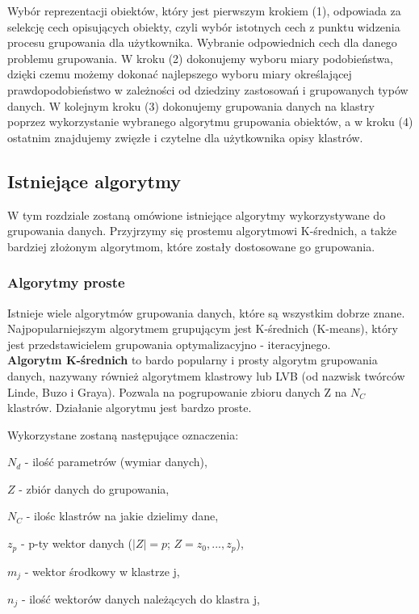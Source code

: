 \documentclass[twoside]{pracaMagisterskaMS}
\begin{document}
Wybór reprezentacji obiektów, który jest pierwszym krokiem (1), odpowiada za selekcję cech opisujących obiekty, czyli wybór istotnych cech z punktu widzenia procesu grupowania dla użytkownika. Wybranie odpowiednich cech dla danego problemu grupowania. W kroku (2) dokonujemy wyboru miary podobieństwa, dzięki czemu możemy dokonać najlepszego wyboru miary określającej prawdopodobieństwo w zależności od dziedziny zastosowań i grupowanych typów danych. W kolejnym kroku (3) dokonujemy grupowania danych na klastry poprzez wykorzystanie wybranego algorytmu grupowania obiektów, a w kroku (4) ostatnim znajdujemy zwięzłe i czytelne dla użytkownika opisy klastrów. 


\subsection{Istniejące algorytmy}

W tym rozdziale zostaną omówione istniejące algorytmy wykorzystywane do grupowania danych. Przyjrzymy się prostemu algorytmowi K-średnich, a także bardziej złożonym algorytmom, które zostały dostosowane go grupowania.

\subsubsection{Algorytmy proste}
Istnieje wiele algorytmów grupowania danych, które są wszystkim dobrze znane. Najpopularniejszym algorytmem grupującym jest K-średnich (K-means), który jest przedstawicielem grupowania optymalizacyjno - iteracyjnego. \\

\textbf{Algorytm K-średnich} to bardo popularny i prosty algorytm grupowania danych, nazywany również algorytmem klastrowy lub LVB (od nazwisk twórców Linde, Buzo i Graya). Pozwala na pogrupowanie zbioru danych Z na $N_C$ klastrów. Działanie algorytmu jest bardzo proste.

Wykorzystane zostaną następujące oznaczenia:


$N_d$ - ilość parametrów (wymiar danych),

$Z$ - zbiór danych do grupowania,

$N_C$ - ilośc klastrów na jakie dzielimy dane, %

$z_p$ - p-ty wektor danych ($|Z| = p$;  $Z = {z_0,...,z_p}$),

$m_j$ - wektor środkowy w klastrze j,

$n_j$ - ilość wektorów danych należących do klastra j,
\end{document}
